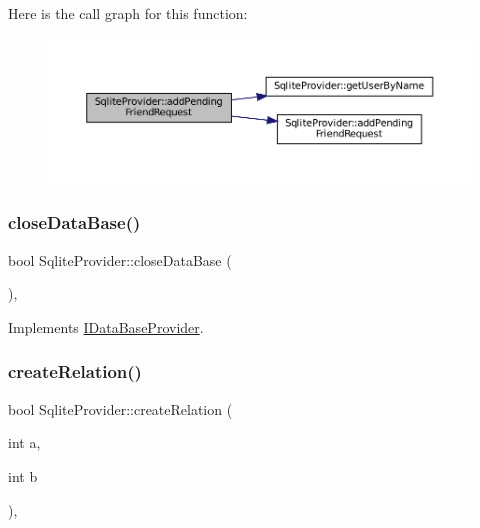 Here is the call graph for this function\+:
\nopagebreak
\begin{figure}[H]
\begin{center}
\leavevmode
\includegraphics[width=350pt]{classSqliteProvider_aac8f8614546a2c5e629ad84a3536adc8_cgraph}
\end{center}
\end{figure}
\mbox{\label{classSqliteProvider_a3f54f53f319d3c9b8c5bec57f2708c07}} 
\subsubsection{\texorpdfstring{close\+Data\+Base()}{closeDataBase()}}
{\footnotesize\ttfamily bool Sqlite\+Provider\+::close\+Data\+Base (\begin{DoxyParamCaption}{ }\end{DoxyParamCaption})\hspace{0.3cm}{\ttfamily [override]}, {\ttfamily [virtual]}}



Implements \mbox{\hyperlink{classIDataBaseProvider_aa7761525c25b0791d58de2429a0892ce}{I\+Data\+Base\+Provider}}.

\mbox{\label{classSqliteProvider_a6dc02301bf2f012306eeed7e867cec08}} 
\subsubsection{\texorpdfstring{create\+Relation()}{createRelation()}\hspace{0.1cm}{\footnotesize\ttfamily [1/2]}}
{\footnotesize\ttfamily bool Sqlite\+Provider\+::create\+Relation (\begin{DoxyParamCaption}\item[{int}]{a,  }\item[{int}]{b }\end{DoxyParamCaption})\hspace{0.3cm}{\ttfamily [override]}, {\ttfamily [virtual]}}



